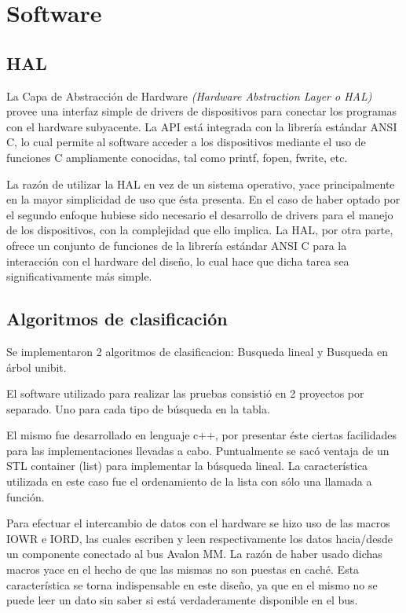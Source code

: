 \section{Software}

\subsection {HAL}

La Capa de Abstracción de Hardware \textit{(Hardware Abstraction Layer o HAL)} provee una interfaz simple de drivers de dispositivos para conectar los programas con el hardware subyacente. La API está integrada con la librería estándar ANSI C, lo cual permite al software acceder a los dispositivos mediante el uso de funciones C ampliamente conocidas, tal como printf, fopen, fwrite, etc.

La razón de utilizar la HAL en vez de un sistema operativo, yace principalmente en la mayor simplicidad de uso que ésta presenta. En el caso de haber optado por el segundo enfoque hubiese sido necesario el desarrollo de drivers para el manejo de los dispositivos, con la complejidad que ello implica. La HAL, por otra parte, ofrece un conjunto de funciones de la librería estándar ANSI C para la interacción con el hardware del diseño, lo cual hace que dicha tarea sea significativamente más simple.



\subsection {Algoritmos de clasificación}

Se implementaron 2 algoritmos de clasificacion: Busqueda lineal y Busqueda en árbol unibit.

El software utilizado para realizar las pruebas consistió en 2 proyectos por separado. Uno para cada tipo de búsqueda en la tabla.

El mismo fue desarrollado en lenguaje c++, por presentar éste ciertas facilidades para las implementaciones llevadas a cabo. Puntualmente se sacó ventaja de un STL container (list) para implementar la búsqueda lineal. La característica utilizada en este caso fue el ordenamiento de la lista con sólo una llamada a función.

Para efectuar el intercambio de datos con el hardware se hizo uso de las macros IOWR e IORD, las cuales escriben y leen respectivamente los datos hacia/desde un componente conectado al bus Avalon MM. La razón de haber usado dichas macros yace en el hecho de que las mismas no son puestas en caché. Esta característica se torna indispensable en este diseño, ya que en el mismo no se puede leer un dato sin saber si está verdaderamente disponible en el bus.


